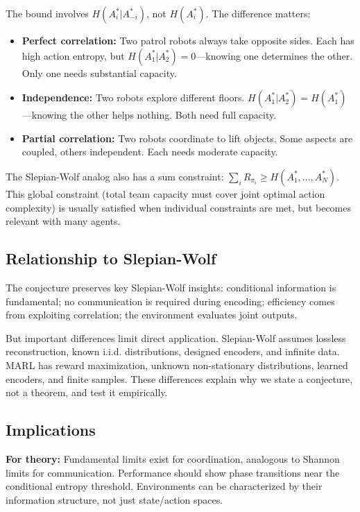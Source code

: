 \documentclass[10pt, letterpaper]{article}
\begin{document}
The bound involves $H(A_i^*|A_{-i}^*)$, not $H(A_i^*)$. The difference matters:
\begin{itemize}
    \item \textbf{Perfect correlation:} Two patrol robots always take opposite sides. Each has high action entropy, but $H(A_1^*|A_2^*) = 0$---knowing one determines the other. Only one needs substantial capacity.
    \item \textbf{Independence:} Two robots explore different floors. $H(A_1^*|A_2^*) = H(A_1^*)$---knowing the other helps nothing. Both need full capacity.
    \item \textbf{Partial correlation:} Two robots coordinate to lift objects. Some aspects are coupled, others independent. Each needs moderate capacity.
\end{itemize}
The Slepian-Wolf analog also has a sum constraint: $\sum_i R_{\pi_i} \geq H(A_1^*, \ldots, A_N^*)$. This global constraint (total team capacity must cover joint optimal action complexity) is usually satisfied when individual constraints are met, but becomes relevant with many agents.

\subsection{Relationship to Slepian-Wolf}

The conjecture preserves key Slepian-Wolf insights: conditional information is fundamental; no communication is required during encoding; efficiency comes from exploiting correlation; the environment evaluates joint outputs.

But important differences limit direct application. Slepian-Wolf assumes lossless reconstruction, known i.i.d. distributions, designed encoders, and infinite data. MARL has reward maximization, unknown non-stationary distributions, learned encoders, and finite samples. These differences explain why we state a conjecture, not a theorem, and test it empirically.

\subsection{Implications}

\textbf{For theory:} Fundamental limits exist for coordination, analogous to Shannon limits for communication. Performance should show phase transitions near the conditional entropy threshold. Environments can be characterized by their information structure, not just state/action spaces.
\end{document}
